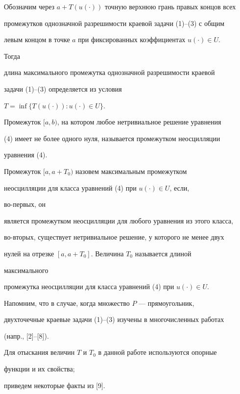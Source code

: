  


Обозначим через $a+T(u(\cdot))$ точную верхнюю грань правых концов всех 


промежутков однозначной разрешимости краевой задачи (1)--(3) с общим 


левым концом в точке $a$ при фиксированных коэффициентах $u(\cdot)\in U$. 


Тогда 


длина максимального промежутка однозначной разрешимости краевой 


задачи (1)--(3) определяется из условия 


$T=\inf\{T(u(\cdot)):u(\cdot)\in U\}$. 


 


Промежуток $[a,b)$, на котором любое нетривиальное решение уравнения 


(4) имеет не более одного нуля, называется промежутком неосцилляции 


уравнения (4). 


 


Промежуток $[a,a+T_0)$ назовем максимальным промежутком 


неосцилляции для класса уравнений (4) при $u(\cdot)\in U$, если, 


во-первых, он 


является промежутком неосцилляции для любого уравнения из этого класса, 


во-вторых, существует нетривиальное решение, у которого не менее двух 


нулей на отрезке $[a,a+T_0]$. Величина $T_0$ называется длиной 


максимального 


промежутка неосцилляции для класса уравнений (4) при $u(\cdot)\in U$. 


 


Напомним, что в случае, когда множество $P$ --- прямоугольник, 


двухточечные краевые задачи (1)--(3) изучены в многочисленных работах 


(напр., [2]--[8]). 


 


Для отыскания величин $T$ и $T_0$ в данной работе используются опорные 


функции и их свойства; 


приведем некоторые факты из [9]. 


